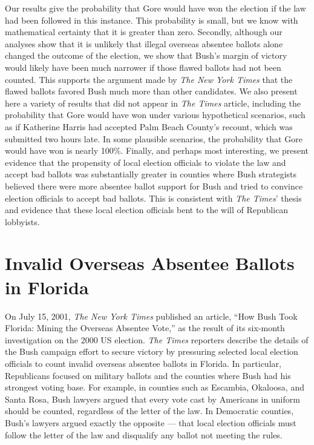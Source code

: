 \documentclass[11pt,titlepage]{article}
\begin{document}
Our results give the probability that Gore would have won the election
if the law had been followed in this instance.  This probability is
small, but we know with mathematical certainty that it is greater than
zero.  Secondly, although our analyses show that it is unlikely that
illegal overseas absentee ballots alone changed the outcome of the
election, we show that Bush's margin of victory would likely have been
much narrower if those flawed ballots had not been counted.  This
supports the argument made by \emph{The New York Times} that the
flawed ballots favored Bush much more than other candidates.  We also
present here a variety of results that did not appear in \emph{The
  Times} article, including the probability that Gore would have won
under various hypothetical scenarios, such as if Katherine Harris had
accepted Palm Beach County's recount, which was submitted two hours
late.  In some plausible scenarios, the probability that Gore would
have won is nearly 100\%.  Finally, and perhaps most interesting, we
present evidence that the propensity of local election officials to
violate the law and accept bad ballots was substantially greater in
counties where Bush strategists believed there were more absentee
ballot support for Bush and tried to convince election officials to
accept bad ballots.  This is consistent with \emph{The Times}' thesis
and evidence that these local election officials bent to the will of
Republican lobbyists.

\section{Invalid Overseas Absentee Ballots in Florida} \label{s:ballots}

On July 15, 2001, \textit{The New York Times} published an article,
``How Bush Took Florida: Mining the Overseas Absentee Vote,'' as the
result of its six-month investigation on the 2000 US election.
\emph{The Times} reporters describe the details of the Bush campaign
effort to secure victory by pressuring selected local election
officials to count invalid overseas absentee ballots in Florida.  In
particular, Republicans focused on military ballots and the counties
where Bush had his strongest voting base.  For example, in counties
such as Escambia, Okaloosa, and Santa Rosa, Bush lawyers argued that
every vote cast by Americans in uniform should be counted, regardless
of the letter of the law.  In Democratic counties, Bush's lawyers
argued exactly the opposite --- that local election officials must
follow the letter of the law and disqualify any ballot not meeting the
rules.
\end{document}

